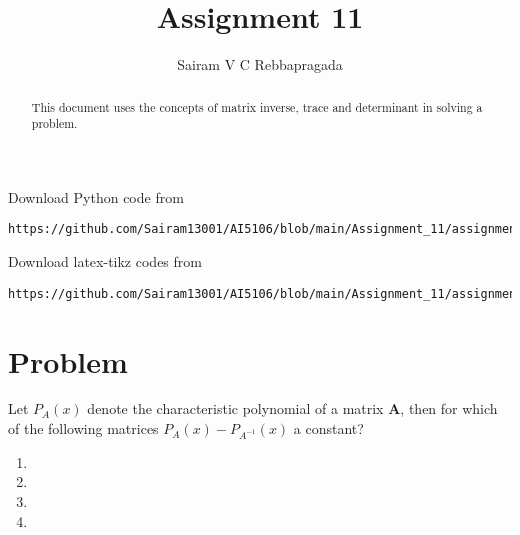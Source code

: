 \documentclass[journal,12pt,twocolumn]{IEEEtran}
\begin{document}
\makeatletter
{}
\makeatother
\let\StandardTheFigure\thefigure
\let\vec\mathbf
\renewcommand{\thefigure}{\theproblem}
\def\putbox#1#2#3{\makebox[0in][l]{\makebox[#1][l]{}\raisebox{\baselineskip}[0in][0in]{\raisebox{#2}[0in][0in]{#3}}}}
     \def\rightbox#1{\makebox[0in][r]{#1}}
     \def\centbox#1{\makebox[0in]{#1}}
     \def\topbox#1{\raisebox{-\baselineskip}[0in][0in]{#1}}
     \def\midbox#1{\raisebox{-0.5\baselineskip}[0in][0in]{#1}}
\vspace{3cm}
\title{Assignment 11}
\author{Sairam V C Rebbapragada}
\maketitle
\newpage
\bigskip
\renewcommand{\thefigure}{\theenumi}
\renewcommand{\thetable}{\theenumi}
\begin{abstract}
This document uses the concepts of matrix inverse, trace and determinant in solving a problem.
\end{abstract}
Download Python code from 
%
\begin{lstlisting}
https://github.com/Sairam13001/AI5106/blob/main/Assignment_11/assignment_11.py
\end{lstlisting}
%
Download latex-tikz codes from 
%
\begin{lstlisting}
https://github.com/Sairam13001/AI5106/blob/main/Assignment_11/assignment_11.tex
\end{lstlisting}

\section{Problem}
Let $P_A(x)$ denote the characteristic polynomial of a matrix $\vec{A}$, then for which of the following matrices $P_A(x) - P_{A^{-1}}(x)$ a constant?
\begin{enumerate}
    \item {} \item {} 
    \item {} \item {}
\end{enumerate}
\end{document}
